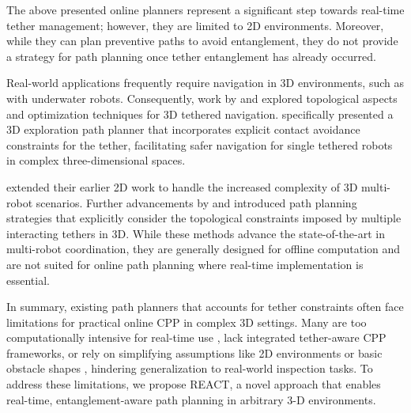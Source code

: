 The above presented online planners represent a significant step towards real-time tether management; however, they are limited to 2D environments. Moreover, while they can plan preventive paths to avoid entanglement, they do not provide a strategy for path planning once tether entanglement has already occurred.

Real-world applications frequently require navigation in 3D environments, such as with underwater robots. Consequently, work by  \cite{bhattacharya2012topological} and \cite{martinez2021optimization} explored topological aspects and optimization techniques for 3D tethered navigation. \cite{petit2022tape} specifically presented a 3D exploration path planner that incorporates explicit contact avoidance constraints for the tether, facilitating safer navigation for single tethered robots in complex three-dimensional spaces.

 \cite{hert1999motion} extended their earlier 2D work to handle the increased complexity of 3D multi-robot scenarios. Further advancements by \cite{patil2023coordinating} and  \cite{cao2023path} introduced path planning strategies that explicitly consider the topological constraints imposed by multiple interacting tethers in 3D. While these methods advance the state-of-the-art in multi-robot coordination, they are generally designed for offline computation and are not suited for online path planning where real-time implementation is essential.

In summary, existing path planners that accounts for tether constraints often face limitations for practical online \ac{CPP} in complex 3D settings. Many are too computationally intensive for real-time use \cite{mechsy2017novel, hert1999motion, patil2023coordinating, cao2023path}, lack integrated tether-aware CPP frameworks, or rely on simplifying assumptions like 2D environments or basic obstacle shapes \cite{kim, withy, cao2023neptune}, hindering generalization to real-world inspection tasks.
To address these limitations, we propose \ac{REACT}, a novel approach that enables real-time, entanglement-aware path planning in arbitrary 3-D environments.


